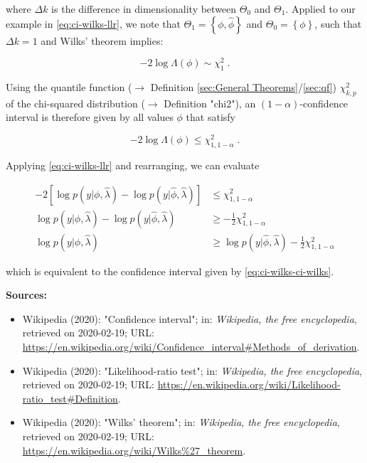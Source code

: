 \documentclass[a4paper,12pt,twoside]{book}
\begin{document}
where $\Delta k$ is the difference in dimensionality between $\Theta_0$ and $\Theta_1$. Applied to our example in \eqref{eq:ci-wilks-llr}, we note that $\Theta_1 = \left\lbrace \phi, \hat{\phi} \right\rbrace$ and $\Theta_0 = \left\lbrace \phi \right\rbrace$, such that $\Delta k = 1$ and Wilks' theorem implies:

\begin{equation} \label{eq:ci-wilks-llr-wilks}
-2 \log \Lambda(\phi) \sim  \chi^2_1 \; .
\end{equation}

Using the quantile function ($\rightarrow$ Definition \ref{sec:General Theorems}/\ref{sec:qf}) $\chi^2_{k,p}$ of the chi-squared distribution ($\rightarrow$ Definition "chi2"), an $(1-\alpha)$-confidence interval is therefore given by all values $\phi$ that satisfy

\begin{equation} \label{eq:ci-wilks-llr-chi2}
-2 \log \Lambda(\phi) \leq \chi^2_{1,1-\alpha} \; .
\end{equation}

Applying \eqref{eq:ci-wilks-llr} and rearranging, we can evaluate

\begin{equation} \label{eq:ci-wilks-llr-chi2-dev}
\begin{split}
-2 \left[ \log p(y|\phi,\hat{\lambda}) - \log p(y|\hat{\phi},\hat{\lambda}) \right] &\leq \chi^2_{1,1-\alpha} \\
\log p(y|\phi,\hat{\lambda}) - \log p(y|\hat{\phi},\hat{\lambda}) &\geq -\frac{1}{2} \chi^2_{1,1-\alpha} \\
\log p(y|\phi,\hat{\lambda}) &\geq \log p(y|\hat{\phi},\hat{\lambda}) - \frac{1}{2} \chi^2_{1,1-\alpha}
\end{split}
\end{equation}

which is equivalent to the confidence interval given by \eqref{eq:ci-wilks-ci-wilks}.


\vspace{1em}
\textbf{Sources:}
\begin{itemize}
\item Wikipedia (2020): "Confidence interval"; in: \textit{Wikipedia, the free encyclopedia}, retrieved on 2020-02-19; URL: \url{https://en.wikipedia.org/wiki/Confidence_interval#Methods_of_derivation}.
\item Wikipedia (2020): "Likelihood-ratio test"; in: \textit{Wikipedia, the free encyclopedia}, retrieved on 2020-02-19; URL: \url{https://en.wikipedia.org/wiki/Likelihood-ratio_test#Definition}.
\item Wikipedia (2020): "Wilks' theorem"; in: \textit{Wikipedia, the free encyclopedia}, retrieved on 2020-02-19; URL: \url{https://en.wikipedia.org/wiki/Wilks%27_theorem}.
\end{itemize}
\end{document}

